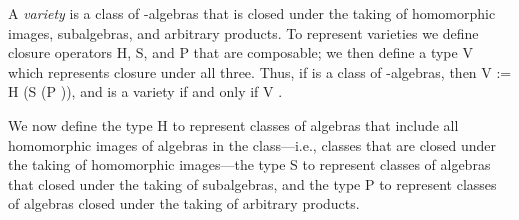 
A \emph{variety} is a class of -algebras that is closed under the taking of
homomorphic images, subalgebras, and arbitrary products.  To represent varieties
we define closure operators \af H, \af S, and \af P that are composable; we
then define a type \af V which represents closure under all three.
Thus, if  is a class of -algebras, then
\af V  := \af H (\af S (\af P )), and  is a variety if and only if \af V   .
\ifshort\else

We now define the type \af H to represent classes of algebras that include all homomorphic images
of algebras in the class---i.e., classes that are closed under the taking of homomorphic
images---the type \af S to represent classes of algebras that closed under the taking of subalgebras,
and the type \af P to represent classes of algebras closed under the taking of arbitrary products.
\fi

